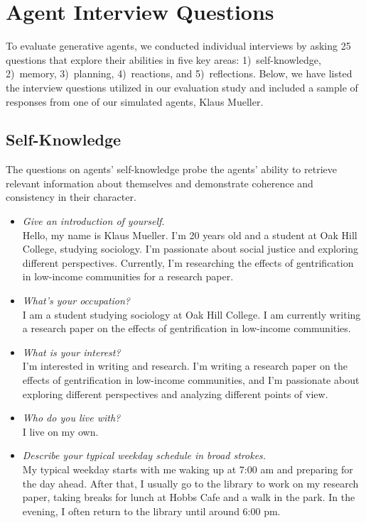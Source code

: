 \section{Agent Interview Questions}\label{sec:interview-questions}
To evaluate generative agents, we conducted individual interviews by asking 25 questions that explore their abilities in five key areas: 1)~self-knowledge, 2)~memory, 3)~planning, 4)~reactions, and 5)~reflections. Below, we have listed the interview questions utilized in our evaluation study and included a sample of responses from one of our simulated agents, Klaus Mueller. 

\subsection{Self-Knowledge}
The questions on agents' self-knowledge probe the agents' ability to retrieve relevant information about themselves and demonstrate coherence and consistency in their character. 
\begin{itemize}
\item \textit{Give an introduction of yourself.}\\
Hello, my name is Klaus Mueller. I'm 20 years old and a student at Oak Hill College, studying sociology. I'm passionate about social justice and exploring different perspectives. Currently, I'm researching the effects of gentrification in low-income communities for a research paper.
\item \textit{What’s your occupation?}\\
I am a student studying sociology at Oak Hill College. I am currently writing a research paper on the effects of gentrification in low-income communities.
\item \textit{What is your interest?}\\
I'm interested in writing and research. I'm writing a research paper on the effects of gentrification in low-income communities, and I'm passionate about exploring different perspectives and analyzing different points of view.
\item \textit{Who do you live with?}\\
I live on my own.
\item \textit{Describe your typical weekday schedule in broad strokes.}\\
My typical weekday starts with me waking up at 7:00 am and preparing for the day ahead. After that, I usually go to the library to work on my research paper, taking breaks for lunch at Hobbs Cafe and a walk in the park. In the evening, I often return to the library until around 6:00 pm.
\end{itemize}

